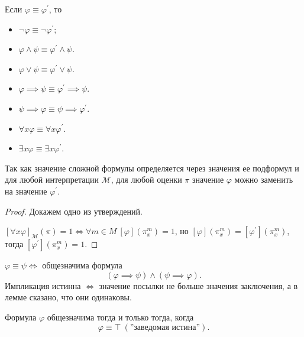 \documentclass[a4paper, fleqn]{article}
\begin{document}
    \begin{lemma}
        Если $\varphi \equiv \varphi^{\prime}$, то
        \begin{itemize}[topsep=0pt]
            \item $\neg \varphi \equiv \neg \varphi^{\prime}$;
            \item $\varphi \land \psi \equiv \varphi^{\prime} \land \psi$.
            \item $\varphi \lor \psi \equiv \varphi^{\prime} \lor \psi$.
            \item $\varphi \implies \psi \equiv \varphi^{\prime} \implies \psi$.
            \item $\psi \implies \varphi \equiv \psi \implies \varphi^{\prime}$.
            \item $\forall x \varphi \equiv \forall x \varphi^{\prime}$.
            \item $\exists x \varphi \equiv \exists x \varphi^{\prime}$.
        \end{itemize}
        Так как значение сложной формулы определяется через значения ее подформул и 
        для любой интерпретации $\mathcal{M}$, для любой оценки $\pi$ значение 
        $\varphi$ можно заменить на значение $\varphi^{\prime}$.
    \end{lemma}

    \begin{proof}
        Докажем одно из утверждений. 

        $[\forall x \varphi]_{\mathcal{M}}(\pi) = 1 
        \iff \forall m \in M~[\varphi]\left( \pi_{x}^{m} \right) = 1$, 
        но $[\varphi]\left( \pi_{x}^{m} \right) = 
        [\varphi^{\prime}]\left( \pi_{x}^{m} \right)$, тогда 
        $[\varphi^{\prime}]\left( \pi_{x}^{m} \right) = 1$.
    \end{proof}

    \begin{lemma}
        $\varphi \equiv \psi \iff $ общезначима формула
        \[
            (\varphi \implies \psi) \land (\psi \implies \varphi).
        \]
        Импликация истинна $\iff$ значение посылки не больше значения заключения, 
        а в лемме сказано, что они одинаковы.
    \end{lemma}
    \begin{lemma}
        Формула $\varphi$ общезначима тогда и только тогда, когда
        \[
            \varphi \equiv \top \ (\text{''заведомая истина''}).
        \]
    \end{lemma}
\end{document}
